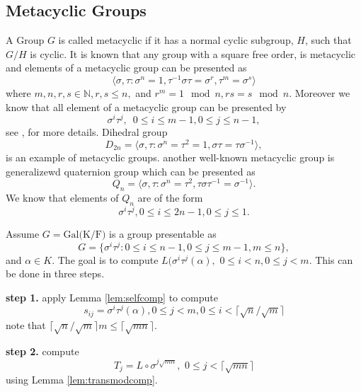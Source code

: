 \subsection{Metacyclic Groups}

A Group $G$ is called metacyclic if it has a normal cyclic subgroup, $H$, such that $G/H$ is cyclic. It is known that any group
with a square free order, is metacyclic and elements of a metacyclic group can be presented as 
\begin{equation}\label{eq:metacyclic}
\langle \sigma,\tau: \sigma^n = 1, \tau^{-1}\sigma \tau = \sigma^r, \tau ^m = \sigma^s \rangle
\end{equation}
where $m,n,r,s \in \mathbb{N}, r,s \leq n,$ and $r^m = 1 \mod n , rs = s \mod n$. Moreover we know that all element of a metacyclic
 group can be presented by $$\sigma^i \tau^j, \,\,\, 0\leq i \leq m-1, 0\leq j \leq n-1,$$ 
see \cite[P.88, Proposition 1]{Johnson}, \cite[P.334]{Curtis} for more details. Dihedral group 
$$D_{2n} = \langle \sigma,\tau: \sigma^n =\tau^2 = 1, \sigma \tau = \tau \sigma^{-1} \rangle, $$
is an example of metacyclic groups. another well-known metacyclic group is generalizewd quaternion
 group which can be presented as
 $$Q_n = \langle \sigma,\tau: \sigma^n =\tau^2, \tau \sigma \tau^{-1} = \sigma^{-1} \rangle.$$
 We know that elements of $Q_n$ are of the form 
 $$\sigma^i\tau^j, 0 \leq i \leq 2n-1 , 0\leq j \leq 1.$$
 
Assume $G = \mathrm{Gal(K/F})$ is a group presentable as
$$G = \lbrace \sigma^i \tau^j: 0\leq i \leq n-1, 0 \leq j \leq m-1, m\leq n \rbrace,$$
and $\alpha\in K$. The goal is to compute 
$L(\sigma^i\tau^j (\alpha), \,\, 0\leq i < n, 0 \leq j <m.$
This can be done in three steps.

\textbf{step 1.} apply Lemma \ref{lem:selfcomp} to compute 
$$s_{ij} = \sigma^i\tau^j(\alpha), 0 \leq j < m, 0\leq i < \lceil \sqrt{n}/\sqrt{m} \rceil$$
note that $\lceil \sqrt{n}/\sqrt{m} \rceil m \leq \lceil \sqrt{mn} \rceil$.

\textbf{step 2.} compute $$T_j = L \circ \sigma^{j\sqrt{mn}}, \,\, 0\leq j < \lceil \sqrt{mn}\rceil$$
using Lemma	\ref{lem:transmodcomp}.


